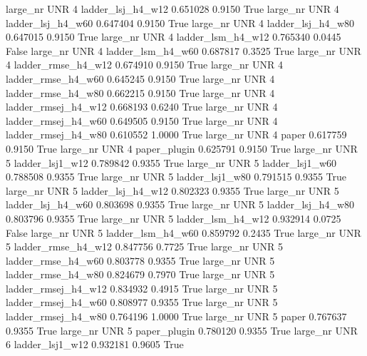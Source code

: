   large_nr      UNR                 4   ladder_lsj_h4_w12   0.651028      0.9150    True
  large_nr      UNR                 4   ladder_lsj_h4_w60   0.647404      0.9150    True
  large_nr      UNR                 4   ladder_lsj_h4_w80   0.647015      0.9150    True
  large_nr      UNR                 4   ladder_lsm_h4_w12   0.765340      0.0445   False
  large_nr      UNR                 4   ladder_lsm_h4_w60   0.687817      0.3525    True
  large_nr      UNR                 4  ladder_rmse_h4_w12   0.674910      0.9150    True
  large_nr      UNR                 4  ladder_rmse_h4_w60   0.645245      0.9150    True
  large_nr      UNR                 4  ladder_rmse_h4_w80   0.662215      0.9150    True
  large_nr      UNR                 4 ladder_rmsej_h4_w12   0.668193      0.6240    True
  large_nr      UNR                 4 ladder_rmsej_h4_w60   0.649505      0.9150    True
  large_nr      UNR                 4 ladder_rmsej_h4_w80   0.610552      1.0000    True
  large_nr      UNR                 4               paper   0.617759      0.9150    True
  large_nr      UNR                 4        paper_plugin   0.625791      0.9150    True
  large_nr      UNR                 5     ladder_lsj1_w12   0.789842      0.9355    True
  large_nr      UNR                 5     ladder_lsj1_w60   0.788508      0.9355    True
  large_nr      UNR                 5     ladder_lsj1_w80   0.791515      0.9355    True
  large_nr      UNR                 5   ladder_lsj_h4_w12   0.802323      0.9355    True
  large_nr      UNR                 5   ladder_lsj_h4_w60   0.803698      0.9355    True
  large_nr      UNR                 5   ladder_lsj_h4_w80   0.803796      0.9355    True
  large_nr      UNR                 5   ladder_lsm_h4_w12   0.932914      0.0725   False
  large_nr      UNR                 5   ladder_lsm_h4_w60   0.859792      0.2435    True
  large_nr      UNR                 5  ladder_rmse_h4_w12   0.847756      0.7725    True
  large_nr      UNR                 5  ladder_rmse_h4_w60   0.803778      0.9355    True
  large_nr      UNR                 5  ladder_rmse_h4_w80   0.824679      0.7970    True
  large_nr      UNR                 5 ladder_rmsej_h4_w12   0.834932      0.4915    True
  large_nr      UNR                 5 ladder_rmsej_h4_w60   0.808977      0.9355    True
  large_nr      UNR                 5 ladder_rmsej_h4_w80   0.764196      1.0000    True
  large_nr      UNR                 5               paper   0.767637      0.9355    True
  large_nr      UNR                 5        paper_plugin   0.780120      0.9355    True
  large_nr      UNR                 6     ladder_lsj1_w12   0.932181      0.9605    True
